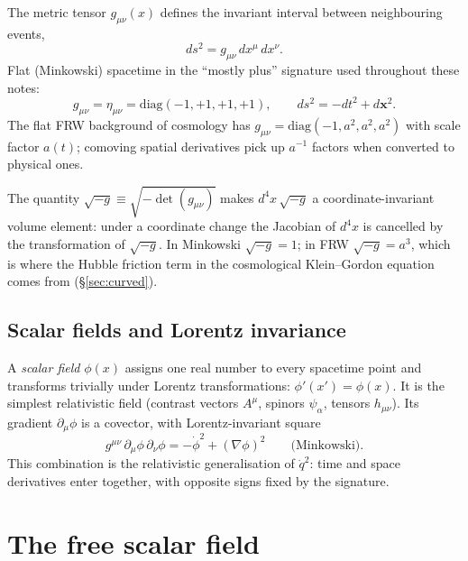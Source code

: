 \documentclass[12pt]{article}
\newcommand{\bx}{\mathbf{x}}
\begin{document}
The metric tensor $g_{\mu\nu}(x)$ defines the invariant interval
between neighbouring events,
%
\begin{equation}
  ds^2 = g_{\mu\nu}\,dx^\mu\,dx^\nu.
\end{equation}
%
Flat (Minkowski) spacetime in the ``mostly plus'' signature used
throughout these notes:
%
\begin{equation}
  g_{\mu\nu} = \eta_{\mu\nu} = \mathrm{diag}(-1, +1, +1, +1),
  \qquad
  ds^2 = -dt^2 + d\bx^2.
\end{equation}
%
The flat FRW background of cosmology has
$g_{\mu\nu} = \mathrm{diag}(-1, a^2, a^2, a^2)$ with scale factor
$a(t)$; comoving spatial derivatives pick up $a^{-1}$ factors when
converted to physical ones.

The quantity $\sqrt{-g} \equiv \sqrt{-\det(g_{\mu\nu})}$ makes
$d^4x\,\sqrt{-g}$ a coordinate-invariant volume element: under a
coordinate change the Jacobian of $d^4x$ is cancelled by the
transformation of $\sqrt{-g}$.  In Minkowski $\sqrt{-g}=1$; in FRW
$\sqrt{-g}=a^3$, which is where the Hubble friction term in the
cosmological Klein--Gordon equation comes from
(\S\ref{sec:curved}).

\subsection{Scalar fields and Lorentz invariance}
\label{sec:scalar}

A \emph{scalar field} $\phi(x)$ assigns one real number to every
spacetime point and transforms trivially under Lorentz
transformations: $\phi'(x') = \phi(x)$.  It is the simplest
relativistic field (contrast vectors $A^\mu$, spinors $\psi_\alpha$,
tensors $h_{\mu\nu}$).  Its gradient $\partial_\mu\phi$ is a
covector, with Lorentz-invariant square
%
\begin{equation}
  g^{\mu\nu}\,\partial_\mu\phi\,\partial_\nu\phi
    = -\dot\phi^2 + (\nabla\phi)^2
  \qquad \text{(Minkowski)}.
  \label{eq:kinetic_square}
\end{equation}
%
This combination is the relativistic generalisation of $\dot q^2$:
time and space derivatives enter together, with opposite signs fixed
by the signature.

\section{The free scalar field}
\label{sec:free}
\end{document}

